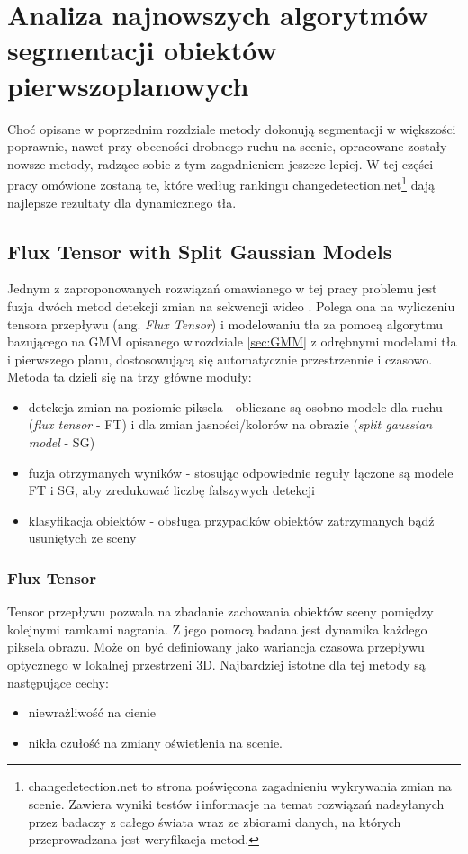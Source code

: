 \renewcommand{\algorithmcfname}{Algorytm}
\chapter{Analiza najnowszych algorytmów segmentacji obiektów pierwszoplanowych}
\label{cha:analiza}

Choć opisane w poprzednim rozdziale metody dokonują segmentacji w większości poprawnie, nawet przy obecności drobnego ruchu na scenie, opracowane zostały nowsze metody, radzące sobie z tym zagadnieniem jeszcze lepiej. W tej części pracy omówione zostaną te, które według rankingu changedetection.net\footnote{changedetection.net to strona poświęcona zagadnieniu wykrywania zmian na scenie. Zawiera wyniki testów i\,informacje na temat rozwiązań nadsyłanych przez badaczy z całego świata wraz ze zbiorami danych, na których przeprowadzana jest weryfikacja metod.} dają najlepsze rezultaty dla dynamicznego tła. 


\section{Flux Tensor with Split Gaussian Models}
\label{sec:FTSG}

Jednym z zaproponowanych rozwiązań omawianego w tej pracy problemu jest fuzja dwóch metod detekcji zmian na sekwencji wideo \citep{6910016}. Polega ona na wyliczeniu tensora przepływu (ang. \textit{Flux Tensor}) i modelowaniu tła za pomocą algorytmu bazującego na GMM opisanego w\,rozdziale \ref{sec:GMM} z odrębnymi modelami tła i pierwszego planu, dostosowującą się automatycznie przestrzennie i czasowo.
Metoda ta dzieli się na trzy główne moduły:
\begin{itemize}
\item detekcja zmian na poziomie piksela - obliczane są osobno modele dla ruchu (\textit{flux tensor} - FT) i dla zmian jasności/kolorów na obrazie (\textit{split gaussian model} - SG)
\item fuzja otrzymanych wyników - stosując odpowiednie reguły łączone są modele FT i SG, aby zredukować liczbę fałszywych detekcji
\item klasyfikacja obiektów - obsługa przypadków obiektów zatrzymanych bądź usuniętych ze sceny
\end{itemize}
\subsection{Flux Tensor}
\label{sec:FT}
Tensor przepływu pozwala na zbadanie zachowania obiektów sceny pomiędzy kolejnymi ramkami nagrania. Z jego pomocą badana jest dynamika każdego piksela obrazu. Może on być definiowany jako wariancja czasowa przepływu optycznego w lokalnej przestrzeni 3D. Najbardziej istotne dla tej metody są następujące cechy:
\begin{itemize}
\item niewrażliwość na cienie
\item nikła czułość na zmiany oświetlenia na scenie.
\end{itemize} 
